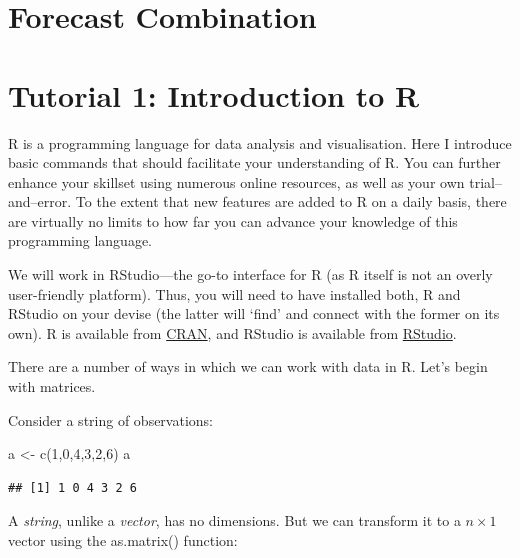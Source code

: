 \documentclass[
  12pt,
  oneside]{book}
\newenvironment{Shaded}{\begin{snugshade}}{\end{snugshade}}
\newcommand{\DecValTok}[1]{\textcolor[rgb]{0.00,0.00,0.81}{#1}}
\newcommand{\FunctionTok}[1]{\textcolor[rgb]{0.00,0.00,0.00}{#1}}
\newcommand{\NormalTok}[1]{#1}
\newcommand{\OtherTok}[1]{\textcolor[rgb]{0.56,0.35,0.01}{#1}}
\begin{document}
\hypertarget{forecast-combination}{%
\chapter{Forecast Combination}\label{forecast-combination}}

\hypertarget{tutorial-1-introduction-to-r}{%
\chapter*{Tutorial 1: Introduction to R}\label{tutorial-1-introduction-to-r}}

R is a programming language for data analysis and visualisation. Here I introduce basic commands that should facilitate your understanding of R. You can further enhance your skillset using numerous online resources, as well as your own trial--and--error. To the extent that new features are added to R on a daily basis, there are virtually no limits to how far you can advance your knowledge of this programming language.

We will work in RStudio---the go-to interface for R (as R itself is not an overly user-friendly platform). Thus, you will need to have installed both, R and RStudio on your devise (the latter will `find' and connect with the former on its own). R is available from \href{https://cran.r-project.org/}{CRAN}, and RStudio is available from \href{https://www.rstudio.com/}{RStudio}.

There are a number of ways in which we can work with data in R. Let's begin with matrices.

Consider a string of observations:

\begin{Shaded}
\begin{Highlighting}[]
\NormalTok{a }\OtherTok{\textless{}{-}} \FunctionTok{c}\NormalTok{(}\DecValTok{1}\NormalTok{,}\DecValTok{0}\NormalTok{,}\DecValTok{4}\NormalTok{,}\DecValTok{3}\NormalTok{,}\DecValTok{2}\NormalTok{,}\DecValTok{6}\NormalTok{)}
\NormalTok{a}
\end{Highlighting}
\end{Shaded}

\begin{verbatim}
## [1] 1 0 4 3 2 6
\end{verbatim}

A \emph{string}, unlike a \emph{vector}, has no dimensions. But we can transform it to a \(n \times 1\) vector using the as.matrix() function:
\end{document}
